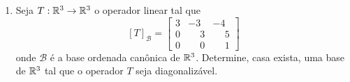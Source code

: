 \begin{exemplo}
\begin{enumerate}[label={\arabic*})]
\begin{solucao}
\begin{itemize}
                \item para $\lambda = i$ temos:
                \[
                    [T - iI_2]_\mathcal{B} = \begin{bmatrix} -i & -1\\\phantom{-}1 & -i\end{bmatrix}
                \]
                e assim $(x,y) \in \aut_T(i)$ se, e s\'o se,
                \[
                    \begin{bmatrix} -i & -1\\\phantom{-}1 & -i\end{bmatrix} \begin{bmatrix} x\\y\end{bmatrix} =
                    \begin{bmatrix} 0\\0\end{bmatrix}.
                \]
                Resolvendo esse sistema, obtemos $x = iy$. Logo
                \[
                    \aut_T(i) = \{(iy,y) \in \complex^2 \mid y \in \complex\} = [(i,1)].
                \]
                Assim, $\mathcal{B}_1 = \{(i,1)\}$ é uma base de $\aut_T(i)$ e então $\dim_\complex\aut_T(i) = 1$.
            \end{itemize}
            Agora o conjunto $\mathcal{D} = \mathcal{B}_1 \cup \mathcal{B}_2 = \{(-i,1); (i,1)\}$ é uma base de $\complex^2$ e $T$ é
            diagonalizável. Nesta base temos
            \[
                [T]_\mathcal{B} = \begin{bmatrix} -i & 0\\\phantom{-}0 & i\end{bmatrix}.
            \]
        \end{solucao}
        \item Seja $T : \mathbb{R}^3 \to \mathbb{R}^3$ o operador linear tal que
        \[
            [T]_\mathcal{B} = \begin{bmatrix}
                                3 & -3 & -4\\
                                0 & \phantom{-}3 & \phantom{-}5\\
                                0 & \phantom{-}0 & \phantom{-}1
                            \end{bmatrix}
        \]
        onde $\mathcal{B}$ é a base ordenada canônica de $\mathbb{R}^3$. Determine, casa exista, uma base de $\mathbb{R}^3$ tal que o operador $T$
        seja diagonalizável.
        \begin{solucao}

\end{solucao}
\end{enumerate}
\end{exemplo}
